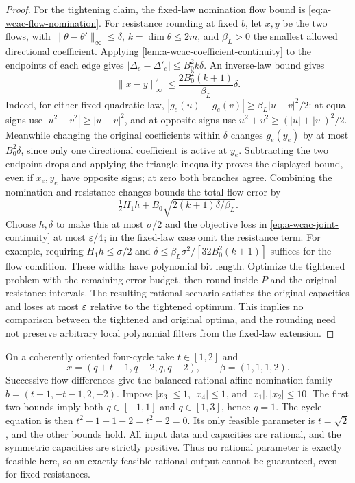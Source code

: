 \begin{proof}
For the tightening claim, the fixed-law nomination flow bound is
\eqref{eq:a-wcac-flow-nomination}. For resistance rounding at fixed $b$,
let $x,y$ be the two flows, with
$\|\theta-\theta'\|_\infty\le\delta$, $k=\dim\theta\le2m$, and
$\beta_L>0$ the smallest allowed directional coefficient. Applying
\cref{lem:a-wcac-coefficient-continuity} to the endpoints of each edge
gives $|\Delta_e-\Delta'_e|\le B_0^2k\delta$. An inverse-law bound gives
\begin{equation}
 \|x-y\|_\infty^2\le
       \frac{2B_0^2(k+1)}{\beta_L}\delta.
 \label{eq:a-wcac-resistance-flow}
\end{equation}
Indeed, for either fixed quadratic law,
$|g_e(u)-g_e(v)|\ge\beta_L|u-v|^2/2$: at equal signs use
$|u^2-v^2|\ge|u-v|^2$, and at opposite signs use
$u^2+v^2\ge(|u|+|v|)^2/2$. Meanwhile changing the original coefficients
within $\delta$ changes $g_e(y_e)$ by at most $B_0^2\delta$, since only
one directional coefficient is active at $y_e$. Subtracting the two
endpoint drops and applying the triangle inequality proves the displayed
bound, even if $x_e,y_e$ have opposite signs; at zero both branches agree.
Combining the nomination and resistance changes bounds the total flow
error by
\[
 \tfrac12 H_1h+
 B_0\sqrt{2(k+1)\delta/\beta_L}.
\]
Choose $h,\delta$ to make this at most $\sigma/2$ and the objective loss
in \eqref{eq:a-wcac-joint-continuity} at most $\varepsilon/4$; in the fixed-law
case omit the resistance term. For example, requiring
$H_1h\le\sigma/2$ and
$\delta\le\beta_L\sigma^2/[32B_0^2(k+1)]$ suffices for the flow condition.
These widths have polynomial bit length. Optimize the tightened
problem with the remaining error budget, then round inside $P$ and the
original resistance intervals. The resulting rational scenario satisfies
the original capacities and loses at most $\varepsilon$ relative to the tightened
optimum. This implies no comparison between the tightened and original
optima, and the rounding need not preserve arbitrary local polynomial
filters from the fixed-law extension.
\end{proof}

\begin{example}
\label{ex:a-wcac-irrational}
On a coherently oriented four-cycle take $t\in[1,2]$ and
\[
 x=(q+t-1,q-2,q,q-2),\qquad \beta=(1,1,1,2).
\]
Successive flow differences give the balanced rational affine nomination
family $b=(t+1,-t-1,2,-2)$. Impose $|x_3|\le1$, $|x_4|\le1$, and
$|x_1|,|x_2|\le10$. The first two bounds imply both $q\in[-1,1]$ and
$q\in[1,3]$, hence $q=1$. The cycle equation is then
$t^2-1+1-2=t^2-2=0$. Its only feasible parameter is $t=\sqrt2$,
and the other bounds hold. All input data and capacities are rational,
and the symmetric capacities are strictly positive. Thus no rational
parameter is exactly feasible here, so an exactly feasible rational
output cannot be guaranteed, even for fixed resistances.
\end{example}


